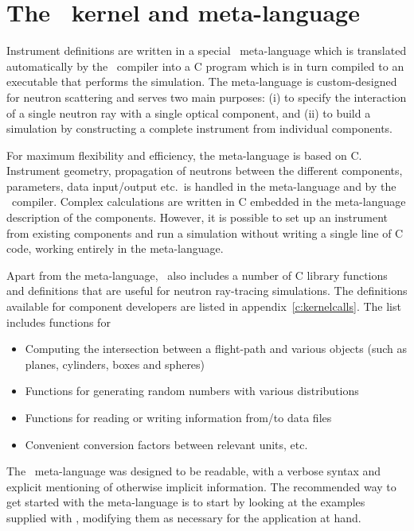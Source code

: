 
\chapter{The \MCS\ kernel and meta-language}
\label{s:kernel}

Instrument definitions are written in a special \MCS\ meta-language which
is translated automatically by the \MCS\ compiler into a C program
which is in turn compiled to an executable that
performs the simulation. The meta-language is custom-designed for neutron
scattering and serves two main purposes: (i) to specify the interaction of a
single neutron ray with a single optical component, and (ii) to build a
simulation by constructing a complete instrument from individual
components.

For maximum flexibility and efficiency, the meta-language is based on C.
Instrument geometry, propagation of neutrons between the different
components, parameters, data input/output etc.\ is handled in the
meta-language and by the \MCS\ compiler. Complex calculations are written in
C embedded in the meta-language description of the
components. However, it is
possible to set up an instrument from existing components and
run a simulation without writing a single line of C code, working
entirely in the meta-language.

Apart from the meta-language, \MCS\ also includes a number of C library
functions and definitions that are useful for neutron ray-tracing
simulations. The definitions available for component developers are
listed in appendix~\ref{c:kernelcalls}. The list includes functions
for
\begin{itemize}
\item Computing the intersection between a flight-path and various
  objects (such as planes, cylinders, boxes and spheres)
\item Functions for generating random numbers
with various distributions
\item Functions for reading or writing information from/to data
  files
\item Convenient conversion factors between relevant units, etc.
\end{itemize}

The \MCS\ meta-language was designed to be readable, with a verbose
syntax and explicit mentioning of otherwise implicit information. The
recommended way to get started with the meta-language is to start by
looking at the examples supplied with \MCS, modifying them as necessary
for the application at hand.

